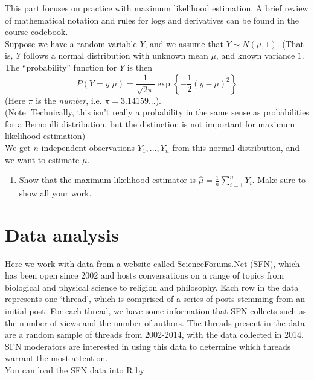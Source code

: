 \documentclass[11pt]{article}
\begin{document}
This part focuses on practice with maximum likelihood estimation. A brief review of mathematical notation and rules for logs and derivatives can be found in the course codebook.\\

\noindent Suppose we have a random variable $Y$, and we assume that $Y \sim N(\mu, 1)$. (That is, $Y$ follows a normal distribution with  unknown mean $\mu$, and known variance $1$. The ``probability'' function for $Y$ is then
$$P(Y = y | \mu) = \frac{1}{\sqrt{2 \pi}} \exp\left\lbrace-\frac{1}{2}(y - \mu)^2\right\rbrace$$
(Here $\pi$ is the \textit{number}, i.e. $\pi = 3.14159...$). \\

\noindent (Note: Technically, this isn't really a probability in the same sense as probabilities for a Bernoulli distribution, but the distinction is not important for maximum likelihood estimation)\\

\noindent We get $n$ independent observations $Y_1,...,Y_n$ from this normal distribution, and we want to estimate $\mu$.

\begin{enumerate}
\item[1.] Show that the maximum likelihood estimator is $\widehat{\mu} = \frac{1}{n} \sum \limits_{i=1}^n Y_i$. Make sure to show all your work.
\end{enumerate}

\newpage

\section{Data analysis}

Here we work with data from a website called ScienceForums.Net (SFN), which has been open since 2002 and hosts conversations on a range of topics from biological and physical science to religion and philosophy. Each row in the data represents one ‘thread’, which is comprised of a series of posts stemming from an initial post. For each thread, we have some information that SFN collects such as the number of views and the number of authors. The threads present in the data are a random sample of threads from 2002-2014, with the data collected in 2014. SFN moderators are interested in using this data to determine which threads warrant the most attention.\\

\noindent You can load the SFN data into R by
\end{document}
